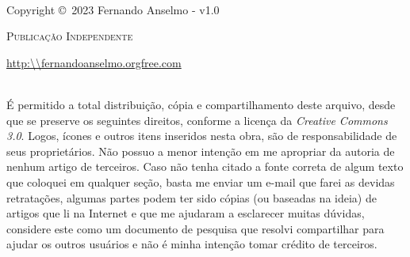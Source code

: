 \documentclass[a4paper,11pt]{book} %
\begin{document}
\begingroup
\thispagestyle{empty}
\vfill
\endgroup

\newpage
~\vfill
\thispagestyle{empty}

\noindent Copyright \copyright\ 2023 Fernando Anselmo - v1.0 %

\noindent \textsc{Publicação Independente} %

\noindent \url{http:\\fernandoanselmo.orgfree.com} %

\noindent \\ É permitido a total distribuição, cópia e compartilhamento deste arquivo, desde que se preserve os seguintes direitos, conforme a licença da \textit{Creative Commons 3.0}. Logos, ícones e outros itens inseridos nesta obra, são de responsabilidade de seus proprietários. Não possuo a menor intenção em me apropriar da autoria de nenhum artigo de terceiros. Caso não tenha citado a fonte correta de algum texto que coloquei em qualquer seção, basta me enviar um e-mail que farei as devidas retratações, algumas partes podem ter sido cópias (ou baseadas na ideia) de artigos que li na Internet e que me ajudaram a esclarecer muitas dúvidas, considere este como um documento de pesquisa que resolvi compartilhar para ajudar os outros usuários e não é minha intenção tomar crédito de terceiros. %


\end{document}
